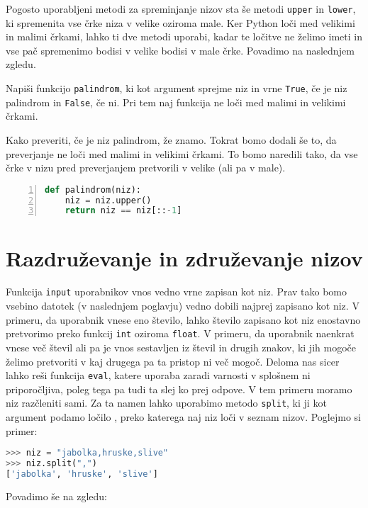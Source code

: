Pogosto uporabljeni metodi za spreminjanje nizov sta še metodi \texttt{upper} in \texttt{lower}, ki spremenita vse črke niza v velike oziroma male. Ker Python loči med velikimi in malimi črkami, lahko ti dve metodi uporabi, kadar te ločitve ne želimo imeti in vse pač spremenimo bodisi v velike bodisi v male črke. Povadimo na naslednjem zgledu.

\begin{zgled}
Napiši funkcijo \texttt{palindrom}, ki kot argument sprejme niz in vrne \texttt{True}, če je niz palindrom in \texttt{False}, če ni. Pri tem naj funkcija ne loči med malimi in velikimi črkami.
\end{zgled}

\begin{resitev}
Kako preveriti, če je niz palindrom, že znamo. Tokrat bomo dodali še to, da preverjanje ne loči med malimi in velikimi črkami. To bomo naredili tako, da vse črke v nizu pred preverjanjem pretvorili v velike (ali pa v male).
\begin{lstlisting}[language=Python, showstringspaces=false,numbers=left]
def palindrom(niz):
    niz = niz.upper()
    return niz == niz[::-1]
\end{lstlisting}
\end{resitev}

\section{Razdruževanje in združevanje nizov}
Funkcija \texttt{input} uporabnikov vnos vedno vrne zapisan kot niz. Prav tako bomo vsebino datotek (v naslednjem poglavju) vedno dobili najprej zapisano kot niz. V primeru, da uporabnik vnese eno število, lahko število zapisano kot niz enostavno pretvorimo preko funkcij \texttt{int} oziroma \texttt{float}. V primeru, da uporabnik naenkrat vnese več števil ali pa je vnos sestavljen iz števil in drugih znakov, ki jih mogoče želimo pretvoriti v kaj drugega pa ta pristop ni več mogoč. Deloma nas sicer lahko reši funkcija \texttt{eval}, katere uporaba zaradi varnosti v splošnem ni priporočljiva, poleg tega pa tudi ta slej ko prej odpove. V tem primeru moramo niz razčleniti  sami. Za ta namen lahko uporabimo metodo \texttt{split}, ki ji kot argument podamo ločilo , preko katerega naj niz loči v seznam nizov. Poglejmo si primer:
\begin{lstlisting}[language=Python, showstringspaces=false]
>>> niz = "jabolka,hruske,slive"
>>> niz.split(",")
['jabolka', 'hruske', 'slive']
\end{lstlisting}
Povadimo še na zgledu:

